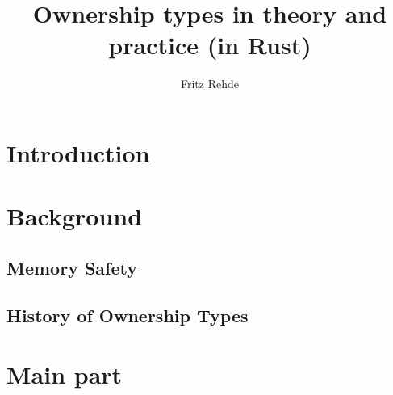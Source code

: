 \documentclass[sigplan,11pt,nonacm]{acmart}
\begin{document}
\title{Ownership types in theory and practice (in Rust)}
\author{Fritz Rehde}

\begin{abstract}



\end{abstract}


\maketitle

\section{Introduction}
\label{sec:introduction}


\section{Background}
\label{sec:background}

\subsection{Memory Safety}



\subsection{History of Ownership Types}




\section{Main part}
\label{sec:mainpart}
\end{document}
